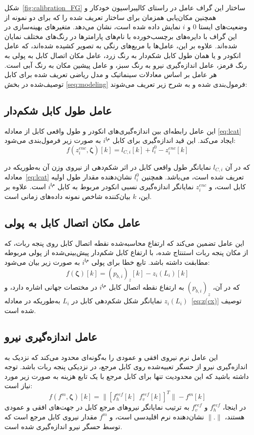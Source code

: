 شکل~\ref{fig:calibration_FG} ساختار این گراف عامل در راستای کالیبراسیون خودکار و همچنین مکان‌یابی همزمان برای ساختار تعریف شده را که برای دو نمونه از وضعیت‌های ایستا $0$ و $i$ نمایش داده شده است، نشان می‌دهد. متغیرهای بهینه‌سازی در این گراف با دایره‌های برچسب‌خورده با نام‌های پارامتر‌ها در رنگ‌های مختلف نمایان شده‌اند.
علاوه بر این، عامل‌ها با مربع‌های رنگی به تصویر کشیده شده‌اند، که عامل انکودر و یا همان طول کابل شکم‌دار به رنگ زرد، عامل مکان اتصال کابل به پولی به رنگ قرمز، عامل اندازه‌گیری نیرو به رنگ سبز، و عامل پیشین مکان به رنگ آبی است. هر عامل بر اساس معادلات سینماتیک و مدل ریاضی تعریف شده برای کابل توصیف‌شده در بخش
\ref{seq:modeling}
 فرمول‌بندی شده و به شرح زیر تعریف می‌شوند:

\subsection{عامل طول کابل شکم‌دار}
این عامل رابطه‌ای بین اندازه‌گیری‌های انکودر و طول واقعی کابل از معادله
\ref{eq:lcat}
 ایجاد می‌کند. این قید اندازه‌گیری برای کابل $i^{ام}$ به صورت زیر فرمول‌بندی می‌شود:
\begin{equation}
	f(z^{enc}_{i}, \bm{\zeta})[k] = l_{C,i}[k] + l^0_i - z^{enc}_{i}[k]
\end{equation}

که در آن $l_{C,i}$ نمایانگر طول واقعی کابل در اثر شکم‌دهی از نیروی وزن آن  به‌طوریکه در معادله~\ref{eq:lcat} تعریف شده است، می‌باشد. همچنین $l^0_i$ نشان‌دهنده مقدار طول اولیه کابل است، و $z^{enc}_{i}$ نمایانگر اندازه‌گیری نسبی انکودر مربوط به کابل $i^{ام}$ است. علاوه بر این، $k$ بیان‌کننده شاخص نمونه داده‌های زمانی است.

\subsection{عامل مکان اتصال کابل به پولی}
این عامل تضمین می‌کند که ارتفاع محاسبه‌شده نقطه اتصال کابل روی پنجه ربات، که از مکان پنجه ربات استنتاج شده، با ارتفاع کابل شکم‌دار پیش‌بینی‌شده از پولی مربوطه مطابقت داشته باشد. تابع خطا برای پولی $i^{ام}$ به صورت زیر بیان می‌شود:
\begin{equation}
	f(\bm{\zeta})[k] = (p_{b,i})_z [k] - z_i(L_i)[k]
\end{equation}
که در آن، $(p_{b,i})_z$ به ارتفاع نقطه اتصال کابل $i^{ام}$ در مختصات جهانی اشاره دارد، و $z_i(L_i)$ نمایانگر شکل شکم‌دهی کابل در $L_i$ به‌طوریکه در معادله~\ref{eq:z(cx)} توصیف شده است.

\subsection{عامل اندازه‌گیری نیرو}
این عامل نرم نیروی افقی و عمودی را به‌گونه‌ای محدود می‌کند که نزدیک به اندازه‌گیری نیرو از حسگر تعبیه‌شده روی کابل مرجع، در نزدیکی پنجه ربات باشد. توجه داشته باشید که این محدودیت تنها برای کابل مرجع با یک تابع هزینه به صورت زیر مورد نیاز است:
\begin{equation}
	f(f^{m}, \bm{\zeta})[k] = \| [f^{ref}_{h}[k]~~f^{ref}_{v}[k]]^T \| - f^{m}[k]
\end{equation}
در اینجا، $f^{ref}_{h}$ و $f^{ref}_{v}$ به ترتیب نمایانگر نیروهای مرجع کابل در جهت‌های افقی و عمودی هستند، $\|.\|$ نشان‌دهنده نرم اقلیدسی است، و $f^{m}$ مقدار  نیروی کابل مرجع است که توسط حسگر نیرو اندازه‌گیری شده است.

